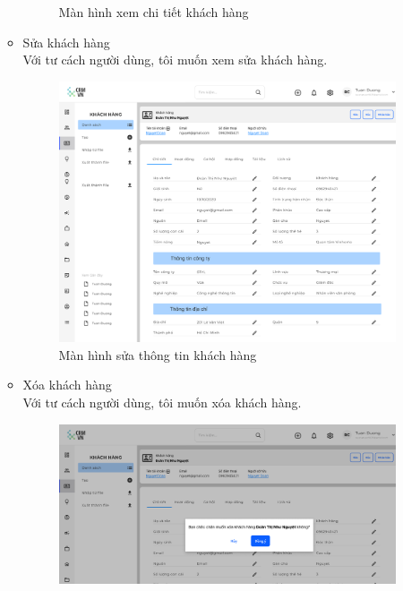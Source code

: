 \documentclass[12pt,a4paper]{article}
\begin{document}
\begin{enumerate}
\begin{itemize}
\begin{figure}[H]
                \vspace{0.5cm}
                \caption{Màn hình xem chi tiết khách hàng}
                \label{chitietKH}
            \end{figure}
            \item Sửa khách hàng \\
            Với tư cách người dùng, tôi muốn xem sửa khách hàng.
            \begin{figure}[H]
                \centering \includegraphics[width=\textwidth]{Img/Nguyet/Khachhang/chitietkhachhang.png}
                \vspace{0.5cm}
                \caption{Màn hình sửa thông tin khách hàng}
                \label{suaKH}
            \end{figure}
            \item Xóa khách hàng \\
            Với tư cách người dùng, tôi muốn xóa khách hàng.
            \begin{figure}[H]
                \centering \includegraphics[width=\textwidth]{Img/Nguyet/Khachhang/xoakhachhang.png}

\end{figure}
\end{itemize}
\end{enumerate}
\end{document}
